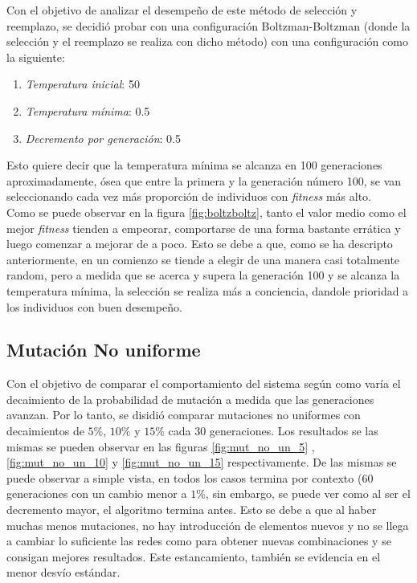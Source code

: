 \documentclass{sig-alternate}
\begin{document}
		Con el objetivo de analizar el desempeño de este método de selección y reemplazo, se decidió probar con una configuración Boltzman-Boltzman (donde la selección y el reemplazo se realiza con dicho método) con una configuración como la siguiente:
			
		\begin{enumerate}			
			\item \textit{Temperatura inicial}: 50
			\item \textit{Temperatura mínima}: 0.5
			\item \textit{Decremento por generación}: 0.5
			\label{eq:boltz}
		\end{enumerate}

		Esto quiere decir que la temperatura mínima se alcanza en 100 generaciones aproximadamente, 	ósea que entre la primera y la generación número 100, se van seleccionando cada vez más proporción de individuos con \textit{fitness} más alto.\\
		Como se puede observar en la figura  \ref{fig:boltzboltz}, tanto el valor medio como el mejor \textit{fitness} tienden a empeorar, comportarse de una forma bastante errática y luego comenzar a mejorar de a poco. Esto se debe a que, como se ha descripto anteriormente, en un comienzo se tiende a elegir de una manera casi totalmente random, pero a medida que se acerca y supera la generación 100 y se alcanza la temperatura mínima, la selección se realiza más a conciencia, dandole prioridad a los individuos con buen desempeño. 
		
		\subsection{Mutación No uniforme}
		
		Con el objetivo de comparar el comportamiento del sistema según como varía el decaimiento de la probabilidad de mutación a medida que las generaciones avanzan. Por lo tanto, se disidió comparar mutaciones no uniformes con decaimientos de $5\%$, $10\%$ y $15\%$ cada 30 generaciones. Los resultados se las mismas se pueden observar en las figuras \ref{fig:mut_no_un_5} , \ref{fig:mut_no_un_10} y \ref{fig:mut_no_un_15} respectivamente. De las mismas se puede observar a simple vista, en todos los casos termina por contexto (60 generaciones con un cambio menor a $1\%$, sin embargo, se puede ver como al ser el decremento mayor, el algoritmo termina antes. Esto se debe a que al haber muchas menos mutaciones, no hay introducción de elementos nuevos y no se llega a cambiar lo suficiente las redes como para obtener nuevas combinaciones y se consigan mejores resultados. Este estancamiento, también se evidencia en el menor desvío estándar.
\end{document}
